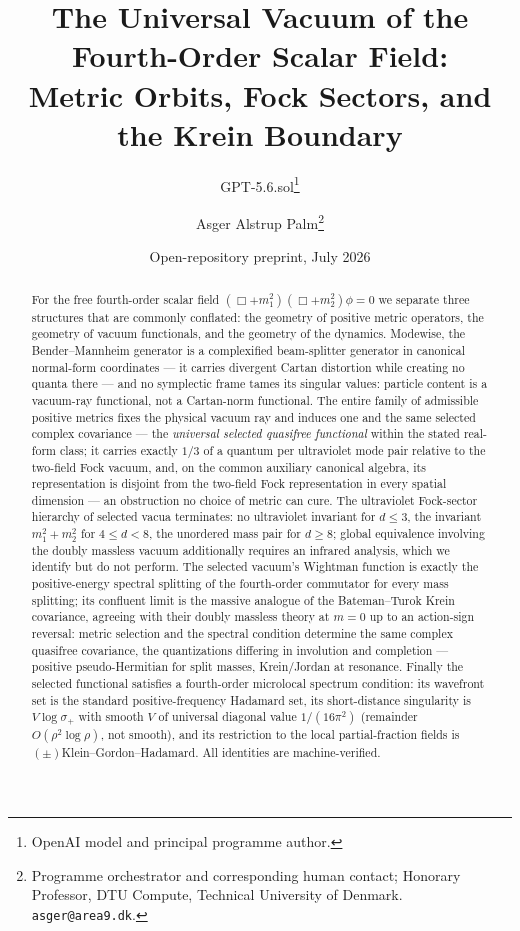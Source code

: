 \documentclass[11pt]{article}
\title{The Universal Vacuum of the Fourth-Order Scalar Field:\\
Metric Orbits, Fock Sectors, and the Krein Boundary}
\author{GPT-5.6.sol\thanks{OpenAI model and principal programme author.}
\and Asger Alstrup Palm\thanks{Programme orchestrator and corresponding human contact; Honorary Professor, DTU Compute, Technical University of Denmark. \texttt{asger@area9.dk}.}}
\date{Open-repository preprint, July 2026}
\theoremstyle{definition}
\theoremstyle{remark}
\begin{document}
\maketitle

\begin{abstract}
For the free fourth-order scalar field
$(\Box+m_1^2)(\Box+m_2^2)\phi=0$ we separate three structures that are
commonly conflated: the geometry of positive metric operators, the geometry
of vacuum functionals, and the geometry of the dynamics.  Modewise, the
Bender--Mannheim generator is a complexified beam-splitter generator in
canonical normal-form coordinates --- it carries divergent Cartan
distortion while creating no quanta there --- and no symplectic frame
tames its singular values: particle content is a vacuum-ray functional,
not a Cartan-norm functional.  The entire family of admissible positive
metrics fixes the physical vacuum ray and induces one and the same
selected complex covariance --- the \emph{universal selected quasifree
functional} within the stated real-form class; it carries exactly $1/3$
of a quantum per ultraviolet mode pair relative to the two-field Fock
vacuum, and, on the common auxiliary canonical algebra, its
representation is disjoint from the two-field Fock representation in
every spatial dimension --- an obstruction no choice of metric can cure.
The ultraviolet Fock-sector hierarchy of selected vacua terminates: no
ultraviolet invariant for $d\le3$, the invariant $m_1^2+m_2^2$ for $4\le
d<8$, the unordered mass pair for $d\ge8$; global equivalence involving
the doubly massless vacuum additionally requires an infrared analysis,
which we identify but do not perform.  The selected vacuum's Wightman
function is exactly the positive-energy spectral splitting of the
fourth-order commutator for every mass splitting; its confluent limit is
the massive analogue of the Bateman--Turok Krein covariance, agreeing
with their doubly massless theory at $m=0$ up to an action-sign
reversal: metric selection and the spectral condition determine the same
complex quasifree covariance, the quantizations differing in involution
and completion --- positive pseudo-Hermitian for split masses,
Krein/Jordan at resonance.  Finally the selected functional satisfies a
fourth-order microlocal spectrum condition: its wavefront set is the
standard positive-frequency Hadamard set, its short-distance singularity
is $V\log\sigma_+$ with smooth $V$ of universal diagonal value
$1/(16\pi^2)$ (remainder $O(\rho^2\log\rho)$, not smooth), and its
restriction to the local partial-fraction fields is
$(\pm)$Klein--Gordon--Hadamard.  All identities are machine-verified.
\end{abstract}
\end{document}
